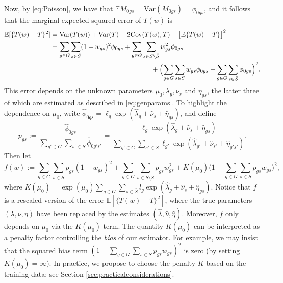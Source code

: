 \documentclass[12pt]{article}
\newcommand{\var}{\mathrm{Var}}
\begin{document}
Now, by \eqref{eq:Poisson}, we have that $\mathbb{E}M_{0gs} = \var(M_{0gs}) = \phi_{0gs}$, and it follows that the marginal expected squared error of $T(w)$ is
\begin{align}
\label{eq:MSE}
\mathbb{E}[\{T(w) - T\}^2] & = \mathrm{Var}(T(w)) + \mathrm{Var}(T) - 2\mathrm{Cov}(T(w), T) + \bigl[\mathbb{E}\{T(w) - T\}\bigr]^2  \nonumber \\
& = \sum_{g \in G} \sum_{s \in \bar{S}}(1- w_{gs})^2\phi_{0gs} + \sum_{g \in G} \sum_{s \in S \setminus \bar{S}}w_{gs}^2\phi_{0gs}  \nonumber \\ & \hspace{150pt} + \Bigl(\sum_{g \in G}\sum_{s \in S}w_{gs}\phi_{0gs}
- \sum_{g \in G} \sum_{s \in \bar{S}}\phi_{0gs} \Bigr)^2.
\end{align} 
This error depends on the unknown parameters $\mu_0, \lambda_g, \nu_s$ and $\eta_{gs}$, the latter three of which are estimated as described in \eqref{eq:genparams}. 
To highlight the dependence on $\mu_0$, write $\hat{\phi}_{0gs} = \ell_g\exp(\hat{\lambda}_g + \hat{\nu}_s + \hat{\eta}_{gs})$, and define
\[
p_{gs}  := \frac{\hat{\phi}_{0gs}}{\sum_{g' \in G} \sum_{s' \in \bar{S}} \hat{\phi}_{0g's'}} = \frac{\ell_g \exp(\hat{\lambda}_g + \hat{\nu}_s + \hat{\eta}_{gs})}{\sum_{g'\in G} \sum_{s'\in \bar{S}} \ell_{g'} \exp(\hat{\lambda}_{g'} + \hat{\nu}_{s'} + \hat{\eta}_{g's'})}.
\]
Then let
\[
f(w) := \sum_{g \in G}\sum_{s \in \bar{S}} p_{gs}(1-w_{gs})^2  + \sum_{g \in G}\sum_{ s\in S \setminus \bar{S}}p_{gs} w_{gs}^2 + K(\mu_0)\big( 1 - \sum_{g \in G}\sum_{s \in S}  p_{gs}w_{gs} \big)^2,
\]
where $K(\mu_0) = \exp(\mu_0)\sum_{g \in G}\sum_{s \in \bar{S}}l_{g}\exp(\hat{\lambda}_g + \hat{\nu}_s + \hat{\eta}_{gs})$. Notice that $f$ is a rescaled version of the error  $\mathbb{E}[\{T(w)-T\}^2]$, where the true parameters $(\lambda, \nu, \eta)$ have been replaced by the estimates $(\hat{\lambda}, \hat{\nu}, \hat{\eta})$. Moreover, $f$ only depends on $\mu_0$ via the $K(\mu_0)$ term. The quantity $K(\mu_0)$ can be interpreted as a penalty factor controlling the \emph{bias} of our estimator. For example, we may insist that the squared bias term $(1 - \sum_{g \in G}\sum_{s \in S}  p_{gs}w_{gs})^2$ is zero (by setting $K(\mu_0) = \infty$). In practice, we propose to choose the penalty $K$ based on the training data; see Section \ref{sec:practicalconsiderations}. 
\end{document}
